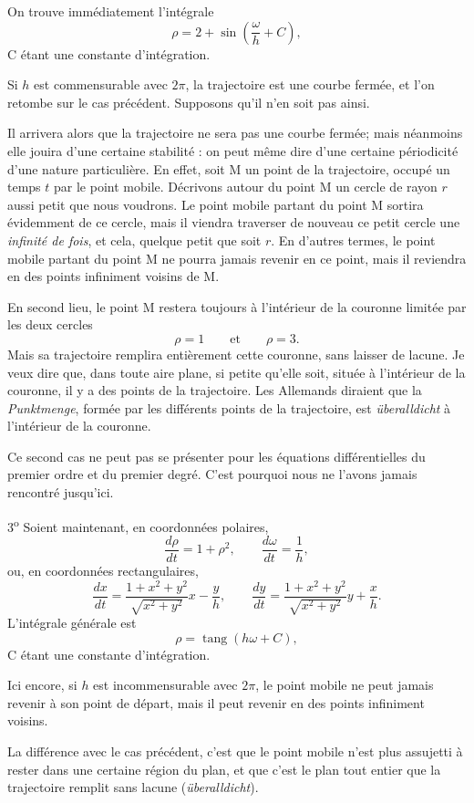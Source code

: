 \documentclass[11pt]{article}
\begin{document}
On trouve immédiatement l’intégrale
\[
\rho=2+\sin\left(\frac{\omega}{h}+C\right),
\]
C étant une constante d’intégration.

Si $h$ est commensurable avec $2\pi$, la trajectoire est une courbe fermée, et l’on retombe sur le cas précédent. Supposons qu’il n’en soit pas ainsi.

Il arrivera alors que la trajectoire ne sera pas une courbe fermée; mais néanmoins elle jouira d’une certaine stabilité : on peut même dire d’une certaine périodicité d’une nature particulière. En effet, soit M un point de la trajectoire, occupé un temps $t$ par le point mobile. Décrivons autour du point M un cercle de rayon $r$ aussi petit que nous voudrons. Le point mobile partant du point M sortira évidemment de ce cercle, mais il viendra traverser de nouveau ce petit cercle une \emph{infinité de fois}, et cela, quelque petit que soit $r$. En d’autres termes, le point mobile partant du point M ne pourra jamais revenir en ce point, mais il reviendra en des points infiniment voisins de M.

En second lieu, le point M restera toujours à l’intérieur de la couronne limitée par les deux cercles
\[
\rho=1\qquad\text{et}\qquad \rho=3.
\]
Mais sa trajectoire remplira entièrement cette couronne, sans laisser de lacune. Je veux dire que, dans toute aire plane, si petite qu’elle soit, située à l’intérieur de la couronne, il y a des points de la trajectoire. Les Allemands diraient que la \emph{Punktmenge}, formée par les différents points de la trajectoire, est \emph{überalldicht} à l’intérieur de la couronne.

Ce second cas ne peut pas se présenter pour les équations différentielles du premier ordre et du premier degré. C’est pourquoi nous ne l’avons jamais rencontré jusqu’ici.

3\textsuperscript{o} Soient maintenant, en coordonnées polaires,
\[
\frac{d\rho}{dt}=1+\rho^2,
\qquad
\frac{d\omega}{dt}=\frac{1}{h},
\]
ou, en coordonnées rectangulaires,
\[
\frac{dx}{dt}=\frac{1+x^2+y^2}{\sqrt{x^2+y^2}}x-\frac{y}{h},
\qquad
\frac{dy}{dt}=\frac{1+x^2+y^2}{\sqrt{x^2+y^2}}y+\frac{x}{h}.
\]
L’intégrale générale est
\[
\rho=\operatorname{tang}(h\omega+C),
\]
C étant une constante d’intégration.

Ici encore, si $h$ est incommensurable avec $2\pi$, le point mobile ne peut jamais revenir à son point de départ, mais il peut revenir en des points infiniment voisins.

La différence avec le cas précédent, c’est que le point mobile n’est plus assujetti à rester dans une certaine région du plan, et que c’est le plan tout entier que la trajectoire remplit sans lacune (\emph{überalldicht}).
\end{document}
